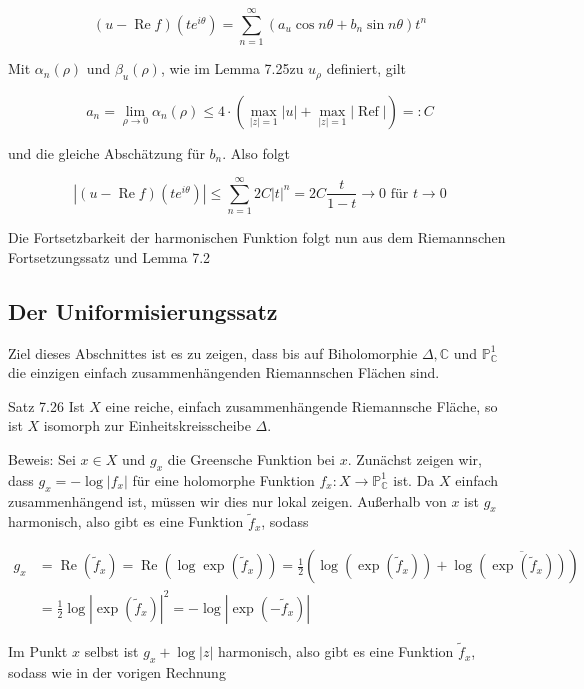 \documentclass[10pt, letterpaper]{article}
\begin{document}
$$
(u-\operatorname{Re} f)\left(t e^{i \theta}\right)=\sum_{n=1}^{\infty}\left(a_{u} \cos n \theta+b_{n} \sin n \theta\right) t^{n}
$$

Mit $\alpha_{n}(\rho)$ und $\beta_{u}(\rho)$, wie im Lemma 7.25zu $u_{\rho}$ definiert, gilt

$$
a_{n}=\lim _{\rho \rightarrow 0} \alpha_{n}(\rho) \leqslant 4 \cdot\left(\max _{|z|=1}|u|+\max _{|z|=1}|\operatorname{Ref}|\right)=: C
$$

und die gleiche Abschätzung für $b_{n}$. Also folgt

$$
\left|(u-\operatorname{Re} f)\left(t e^{i \theta}\right)\right| \leqslant \sum_{n=1}^{\infty} 2 C|t|^{n}=2 C \frac{t}{1-t} \longrightarrow 0 \text { für } t \rightarrow 0
$$

Die Fortsetzbarkeit der harmonischen Funktion folgt nun aus dem Riemannschen Fortsetzungssatz und Lemma 7.2

\subsection {Der Uniformisierungssatz}
Ziel dieses Abschnittes ist es zu zeigen, dass bis auf Biholomorphie $\Delta, \mathbb{C}$ und $\mathbb{P}_{\mathbb{C}}^{1}$ die einzigen einfach zusammenhängenden Riemannschen Flächen sind.

Satz 7.26 Ist $X$ eine reiche, einfach zusammenhängende Riemannsche Fläche, so ist $X$ isomorph zur Einheitskreisscheibe $\Delta$.

Beweis: Sei $x \in X$ und $g_{x}$ die Greensche Funktion bei $x$. Zunächst zeigen wir, dass $g_{x}=-\log \left|f_{x}\right|$ für eine holomorphe Funktion $f_{x}: X \longrightarrow \mathbb{P}_{\mathbb{C}}^{1}$ ist. Da $X$ einfach zusammenhängend ist, müssen wir dies nur lokal zeigen. Außerhalb von $x$ ist $g_{x}$ harmonisch, also gibt es eine Funktion $\widetilde{f}_{x}$, sodass

$$
\begin{aligned}
g_{x} & =\operatorname{Re}\left(\widetilde{f}_{x}\right)=\operatorname{Re}\left(\log \exp \left(\widetilde{f}_{x}\right)\right)=\frac{1}{2}\left(\log \left(\exp \left(\widetilde{f}_{x}\right)\right)+\log \overline{\left(\exp \left(\widetilde{f}_{x}\right)\right)}\right) \\
& =\frac{1}{2} \log \left|\exp \left(\widetilde{f}_{x}\right)\right|^{2}=-\log \left|\exp \left(-\widetilde{f}_{x}\right)\right|
\end{aligned}
$$

Im Punkt $x$ selbst ist $g_{x}+\log |z|$ harmonisch, also gibt es eine Funktion $\widetilde{f}_{x}$, sodass wie in der vorigen Rechnung
\end{document}
